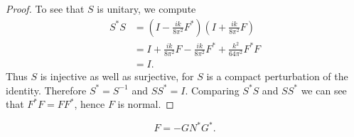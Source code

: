 \begin{proof}
  To see that $S$ is unitary, we compute
  \begin{align*}
    S^*S&=\left(I - \frac{ik}{8\pi^2}F^*\right)\left(I + \frac{ik}{8\pi^2}F\right)\\
        &= I + \frac{ik}{8\pi^2}F - \frac{ik}{8\pi^2}F^* + \frac{k^2}{64\pi^2}F^*F\\
        &= I. 
  \end{align*}
  Thus $S$ is injective as well as surjective, for $S$ is a compact perturbation of the identity. Therefore $S^*=S^{-1}$ and $SS^*=I$. Comparing $S^*S$ and $SS^*$ we can see that $F^*F=FF^*$, hence $F$ is normal.
  
\end{proof}

\begin{prp}
  $$F=-GN^*G^*.$$ 
\end{prp}

